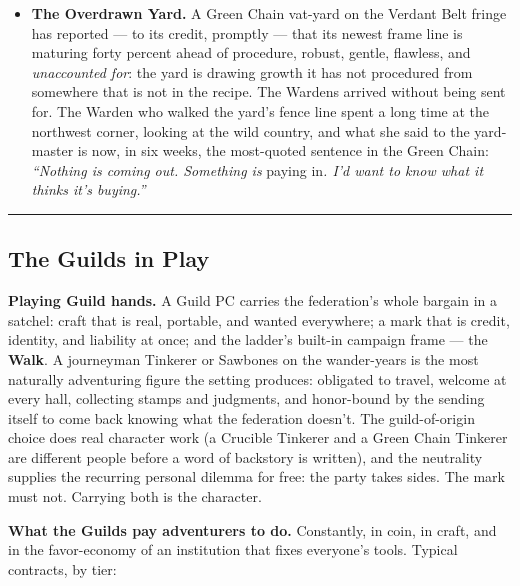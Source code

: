 \begin{itemize}
    \item \textbf{The Overdrawn Yard.} A Green Chain vat-yard on the Verdant Belt fringe has reported --- to its credit, promptly --- that its newest frame line is maturing forty percent ahead of procedure, robust, gentle, flawless, and \textit{unaccounted for}: the yard is drawing growth it has not procedured from somewhere that is not in the recipe. The Wardens arrived without being sent for. The Warden who walked the yard's fence line spent a long time at the northwest corner, looking at the wild country, and what she said to the yard-master is now, in six weeks, the most-quoted sentence in the Green Chain: \textit{``Nothing is coming out. Something is} paying in\textit{. I'd want to know what it thinks it's buying.''}
\end{itemize}

\medskip\hrule\medskip

\subsection{The Guilds in Play}

\textbf{Playing Guild hands.} A Guild PC carries the federation's whole bargain in a satchel: craft that is real, portable, and wanted everywhere; a mark that is credit, identity, and liability at once; and the ladder's built-in campaign frame --- the \textbf{Walk}. A journeyman Tinkerer or Sawbones on the wander-years is the most naturally adventuring figure the setting produces: obligated to travel, welcome at every hall, collecting stamps and judgments, and honor-bound by the sending itself to come back knowing what the federation doesn't. The guild-of-origin choice does real character work (a Crucible Tinkerer and a Green Chain Tinkerer are different people before a word of backstory is written), and the neutrality supplies the recurring personal dilemma for free: the party takes sides. The mark must not. Carrying both is the character.

\textbf{What the Guilds pay adventurers to do.} Constantly, in coin, in craft, and in the favor-economy of an institution that fixes everyone's tools. Typical contracts, by tier:

